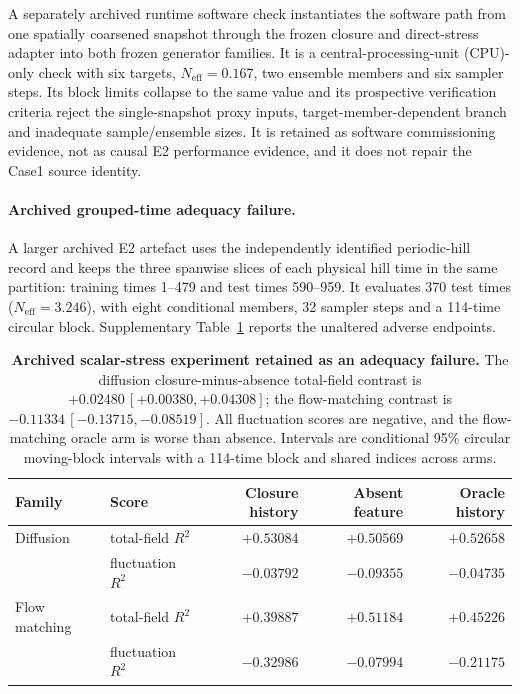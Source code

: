 \documentclass[11pt]{article}
\begin{document}
A separately archived runtime software check
instantiates the software path from one spatially coarsened snapshot through
the frozen closure and direct-stress adapter into both frozen generator families. It is a central-processing-unit (CPU)-only
check with six targets, $N_{\mathrm{eff}}=0.167$, two ensemble members and six sampler steps. Its
block limits collapse to the same value and its prospective verification criteria reject the
single-snapshot proxy inputs, target-member-dependent branch and inadequate sample/ensemble sizes.
It is retained as software commissioning evidence, not as causal E2 performance evidence, and it
does not repair the Case1 source identity.

\paragraph{Archived grouped-time adequacy failure.}
A larger archived E2 artefact uses the independently identified periodic-hill record and keeps the
three spanwise slices of each physical hill time in the same partition: training times 1--479 and
test times 590--959. It evaluates 370 test times ($N_{\mathrm{eff}}=3.246$), with eight
conditional members, 32 sampler steps and a 114-time circular block. Supplementary
Table~\ref{tab:s-archived-e2} reports the unaltered adverse endpoints.

\begin{table}[h]
\centering
\small
\begin{tabular}{@{}llrrr@{}}
\toprule
Family & Score & Closure history & Absent feature & Oracle history \\
\midrule
Diffusion & total-field $R^2$ & $+0.53084$ & $+0.50569$ & $+0.52658$ \\
          & fluctuation $R^2$ & $-0.03792$ & $-0.09355$ & $-0.04735$ \\
Flow matching & total-field $R^2$ & $+0.39887$ & $+0.51184$ & $+0.45226$ \\
              & fluctuation $R^2$ & $-0.32986$ & $-0.07994$ & $-0.21175$ \\
\bottomrule
\end{tabular}
\caption{\textbf{Archived scalar-stress experiment retained as an adequacy failure.}
The diffusion closure-minus-absence total-field contrast is
$+0.02480\,[+0.00380,+0.04308]$; the flow-matching contrast is
$-0.11334\,[-0.13715,-0.08519]$. All fluctuation scores are negative, and the flow-matching oracle
arm is worse than absence. Intervals are conditional 95\% circular moving-block intervals with a
114-time block and shared indices across arms.}\label{tab:s-archived-e2}
\end{table}
\end{document}
